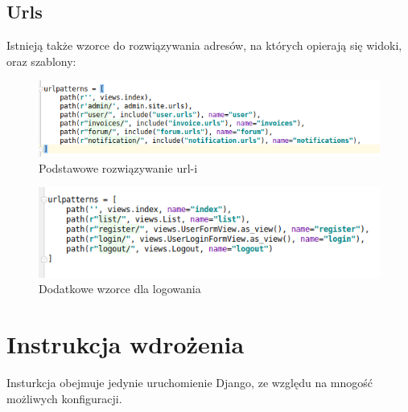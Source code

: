 \documentclass[12pt]{article}
\begin{document}
	\subsection{Urls}
	Istnieją także wzorce do rozwiązywania adresów, na których opierają się widoki, oraz szablony:
	\begin{figure}[H]
		\centering
		\includegraphics[scale=0.7]{img/c_urls.png}
		\caption{Podstawowe rozwiązywanie url-i}
	\end{figure}
	\begin{figure}[H]
		\centering
		\includegraphics[scale=0.7]{img/c_user_urls.png}
		\caption{Dodatkowe wzorce dla logowania}
	\end{figure}
	
	\section{Instrukcja wdrożenia}
	Insturkcja obejmuje jedynie uruchomienie Django, ze względu na mnogość możliwych konfiguracji.
	
\end{document}
